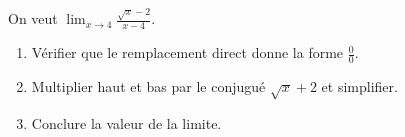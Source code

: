 \documentclass[11pt,a4paper]{article}
\begin{document}
\begin{exercice}
On veut $\displaystyle\lim_{x\to 4}\frac{\sqrt{x}-2}{x-4}$.
\begin{enumerate}[label=\alph*),leftmargin=2em,itemsep=3pt]
  \item Vérifier que le remplacement direct donne la forme $\frac00$.
  \item Multiplier haut et bas par le conjugué $\sqrt{x}+2$ et simplifier.
  \item Conclure la valeur de la limite.
\end{enumerate}
\end{exercice}
\end{document}
